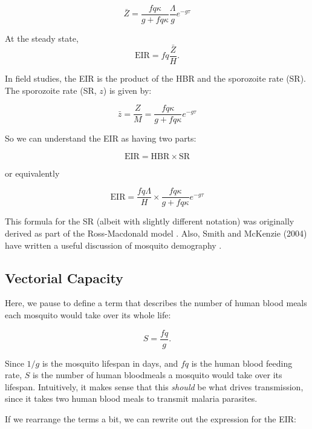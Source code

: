 \documentclass[
]{book}
\begin{document}
\begin{equation}
\bar Z =  \frac{f q \kappa}{g + fq \kappa} \frac{\Lambda}{g} e^{-g\tau} 
\end{equation}

At the steady state, \[\mbox{EIR} = fq \frac{\bar Z}{H}.\]

In field studies, the EIR is the product of the HBR and the sporozoite rate (SR). The sporozoite rate (SR, \(z\)) is given by:

\begin{equation}
\bar z =  \frac{Z}{M} = \frac{f q \kappa}{g + fq \kappa} e^{-g\tau} 
\end{equation}

So we can understand the EIR as having two parts:

\begin{equation}
\mbox{EIR} = \mbox{HBR} \times  \mbox{SR} 
\end{equation}

or equivalently

\begin{equation}
\mbox{EIR} = \frac{\textstyle{fq\Lambda}}{\textstyle{H}} \times \frac{\textstyle{f q \kappa}}{\textstyle{g + fq \kappa}} e^{-g\tau} 
\end{equation}

This formula for the SR (albeit with slightly different notation) was originally derived as part of the Ross-Macdonald model \autocite{MacdonaldG1952Sporozoite,ArmitageP1953}. Also, Smith and McKenzie (2004) have written a useful discussion of mosquito demography \autocite{SmithDL2004Statics}.

\subsection{Vectorial Capacity}\label{vectorial-capacity}

Here, we pause to define a term that describes the number of human blood meals each mosquito would take over its whole life:

\[S = \frac{fq}{g}.\]

Since \(1/g\) is the mosquito lifespan in days, and \(fq\) is the human blood feeding rate, \(S\) is the number of human bloodmeals a mosquito would take over its lifespan. Intuitively, it makes sense that this \emph{should} be what drives transmission, since it takes two human blood meals to transmit malaria parasites.

If we rearrange the terms a bit, we can rewrite out the expression for the EIR:
\end{document}
